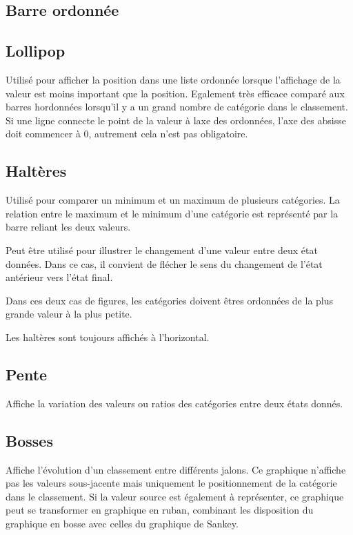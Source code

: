 \documentclass[a4paper,12pt]{article}
\begin{document}
\begin{multicols}{2}
\subsection*{Barre ordonnée}
\label{sec:org3b79eb8}

\subsection*{Lollipop}
\label{sec:org07abb6d}
Utilisé pour afficher la position dans une liste ordonnée lorsque l'affichage de la valeur est moins important que la position. Egalement très efficace comparé aux barres hordonnées lorsqu'il y a un grand nombre de catégorie dans le classement. Si une ligne connecte le point de la valeur à laxe des ordonnées, l'axe des absisse doit commencer à 0, autrement cela n'est pas obligatoire.
\subsection*{Haltères}
\label{sec:org35d097f}
Utilisé pour comparer un minimum et un maximum de plusieurs catégories. La relation entre le maximum et le minimum d'une catégorie est représenté par la barre reliant les deux valeurs.

Peut être utilisé pour illustrer le changement d'une valeur entre deux état données. Dans ce cas, il convient de flécher le sens du changement de l'état antérieur vers l'état final.

Dans ces deux cas de figures, les catégories doivent êtres ordonnées de la plus grande valeur à la plus petite.

Les haltères sont toujours affichés à l'horizontal.
\subsection*{Pente}
\label{sec:org45ad9fe}
Affiche la variation des valeurs ou ratios des catégories entre deux états donnés.
\subsection*{Bosses}
\label{sec:org368ac73}
Affiche l'évolution d'un classement entre différents jalons. Ce graphique n'affiche pas les valeurs sous-jacente mais uniquement le positionnement de la catégorie dans le classement.\autocite{jonathanschwabish5Time2021} Si la valeur source est également à représenter, ce graphique peut se transformer en graphique en ruban, combinant les disposition du graphique en bosse avec celles du graphique de Sankey.\autocite{jonathanschwabish5Time2021}

\end{multicols}
\end{document}
